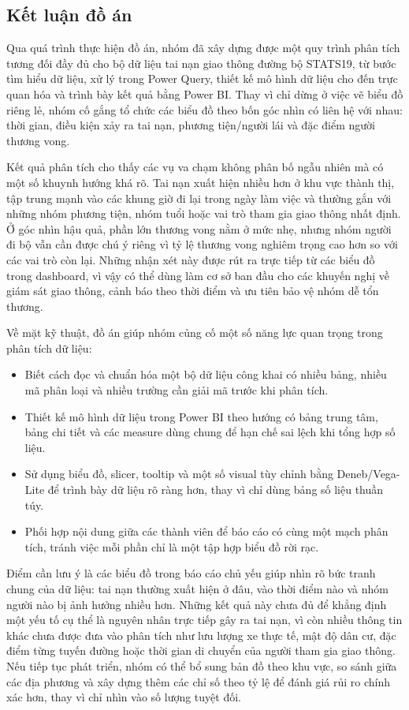 \subsection{Kết luận đồ án}
Qua quá trình thực hiện đồ án, nhóm đã xây dựng được một quy trình phân tích tương đối đầy đủ cho bộ dữ liệu tai nạn giao thông đường bộ STATS19, từ bước tìm hiểu dữ liệu, xử lý trong Power Query, thiết kế mô hình dữ liệu cho đến trực quan hóa và trình bày kết quả bằng Power BI. Thay vì chỉ dừng ở việc vẽ biểu đồ riêng lẻ, nhóm cố gắng tổ chức các biểu đồ theo bốn góc nhìn có liên hệ với nhau: thời gian, điều kiện xảy ra tai nạn, phương tiện/người lái và đặc điểm người thương vong.

Kết quả phân tích cho thấy các vụ va chạm không phân bố ngẫu nhiên mà có một số khuynh hướng khá rõ. Tai nạn xuất hiện nhiều hơn ở khu vực thành thị, tập trung mạnh vào các khung giờ đi lại trong ngày làm việc và thường gắn với những nhóm phương tiện, nhóm tuổi hoặc vai trò tham gia giao thông nhất định. Ở góc nhìn hậu quả, phần lớn thương vong nằm ở mức nhẹ, nhưng nhóm người đi bộ vẫn cần được chú ý riêng vì tỷ lệ thương vong nghiêm trọng cao hơn so với các vai trò còn lại. Những nhận xét này được rút ra trực tiếp từ các biểu đồ trong dashboard, vì vậy có thể dùng làm cơ sở ban đầu cho các khuyến nghị về giám sát giao thông, cảnh báo theo thời điểm và ưu tiên bảo vệ nhóm dễ tổn thương.

Về mặt kỹ thuật, đồ án giúp nhóm củng cố một số năng lực quan trọng trong phân tích dữ liệu:
\begin{itemize}
    \item Biết cách đọc và chuẩn hóa một bộ dữ liệu công khai có nhiều bảng, nhiều mã phân loại và nhiều trường cần giải mã trước khi phân tích.
    \item Thiết kế mô hình dữ liệu trong Power BI theo hướng có bảng trung tâm, bảng chi tiết và các measure dùng chung để hạn chế sai lệch khi tổng hợp số liệu.
    \item Sử dụng biểu đồ, slicer, tooltip và một số visual tùy chỉnh bằng Deneb/Vega-Lite để trình bày dữ liệu rõ ràng hơn, thay vì chỉ dùng bảng số liệu thuần túy.
    \item Phối hợp nội dung giữa các thành viên để báo cáo có cùng một mạch phân tích, tránh việc mỗi phần chỉ là một tập hợp biểu đồ rời rạc.
\end{itemize}

Điểm cần lưu ý là các biểu đồ trong báo cáo chủ yếu giúp nhìn rõ bức tranh chung của dữ liệu: tai nạn thường xuất hiện ở đâu, vào thời điểm nào và nhóm người nào bị ảnh hưởng nhiều hơn. Những kết quả này chưa đủ để khẳng định một yếu tố cụ thể là nguyên nhân trực tiếp gây ra tai nạn, vì còn nhiều thông tin khác chưa được đưa vào phân tích như lưu lượng xe thực tế, mật độ dân cư, đặc điểm từng tuyến đường hoặc thời gian di chuyển của người tham gia giao thông. Nếu tiếp tục phát triển, nhóm có thể bổ sung bản đồ theo khu vực, so sánh giữa các địa phương và xây dựng thêm các chỉ số theo tỷ lệ để đánh giá rủi ro chính xác hơn, thay vì chỉ nhìn vào số lượng tuyệt đối.

